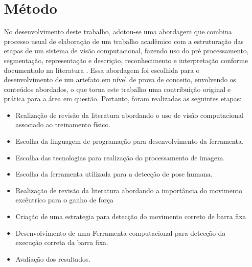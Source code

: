 \section[Método]{Método}\label{sec:Metodo}

No desenvolvimento deste trabalho, adotou-se uma abordagem que combina processo usual de elaboração de um trabalho acadêmico com a estruturação das etapas de um sistema de visão computacional, fazendo uso do pré processamento, segmentação, representação e descrição, reconhecimento e interpretação conforme documentado na literatura \cite{imagemMonocromatica}. Essa abordagem foi escolhida para o desenvolvimento de um artefato em nível de prova de conceito, envolvendo os conteúdos abordados, o que torna este trabalho uma contribuição original e prática para a área em questão. Portanto, foram realizadas as seguintes etapas:


 \begin{itemize}
   \item Realização de revisão da literatura abordando o uso de visão computacional associado ao treinamento físico.
   \item Escolha da linguagem de programação para desenvolvimento da ferramenta.
   \item Escolha das tecnologias para realização do processamento de imagem.
   \item Escolha da ferramenta utilizada para a detecção de pose humana.  
   \item Realização de revisão da literatura abordando a importância do movimento excêntrico para o ganho de força
   \item Criação de uma estrategia para detecção do movimento correto de barra fixa    
   \item Desenvolvimento de uma Ferramenta computacional para detecção da execução correta da barra fixa.
   \item Avaliação dos resultados.
   
 \end{itemize}
